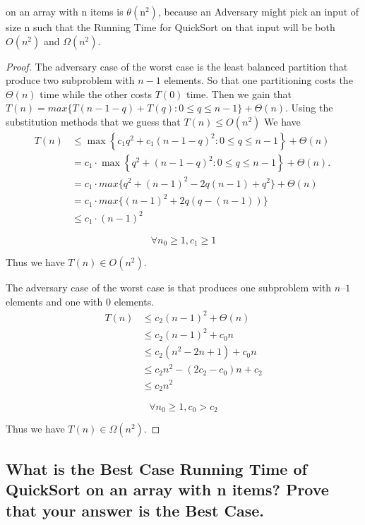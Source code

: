 \documentclass[a4paper]{article}
\begin{document}
on an array with $\mathrm{n}$ items is $\theta\left(\mathrm{n}^2\right)$, because an Adversary might pick an input of size $\mathrm{n}$ such that the Running Time for QuickSort on that input will be both $O\left(n^2\right)$ and $\Omega\left(n^2\right)$.
\begin{proof}
The adversary case of the worst case is the least balanced partition that produce two subproblem with $n-1$ elements. So that one partitioning costs the $\Theta(n) $ time while the other costs $T(0)$ time. Then we gain that $T(n)=max\{T(n-1-q)+T(q) : 0\leq q\leq n-1\}+ \Theta(n)$. Using the substitution methods that we guess that $T(n)\leq O(n^2)$
We have 
$$\begin{aligned} T(n) & \leq \max \left\{c_1 q^2+c_1(n-1-q)^2: 0 \leq q \leq n-1\right\}+\Theta(n) \\ &=c_1 \cdot \max \left\{q^2+(n-1-q)^2: 0 \leq q \leq n-1\right\}+\Theta(n) . \
\\ &= c_1 \cdot max \{q^2+(n-1)^2-2 q(n-1)+q^2\} + \Theta(n)
\\ &=c_1 \cdot max\{(n-1)^2+2q(q-(n-1)) \}
\\ &\leq c_1 \cdot(n-1)^2  \end{aligned}$$

$$\forall n_0 \geq 1, c_1\geq 1$$

Thus we have $T(n)\in O(n^2)$.

The adversary case of the worst case is that produces one subproblem with $n – 1$ elements and one with 0 elements.
$$\begin{aligned} T(n) & \leq c_2(n-1)^2+\Theta(n) \\ & \leq c_2(n-1)^2+c_0 n \\ & \leq c_2\left(n^2-2 n+1\right)+c_0 n \\ & \leq c_2 n^2-\left(2 c_2-c_0\right) n+c_2 \\ & \leq c_2 n^2 \end{aligned}$$

$$\forall n_0 \geq 1, c_0>c_2$$

Thus we have $T(n)\in \Omega(n^2)$.

\end{proof}

\subsection{What is the Best Case Running Time of QuickSort on an array with n items?  Prove that your answer is the Best Case.}
\end{document}
